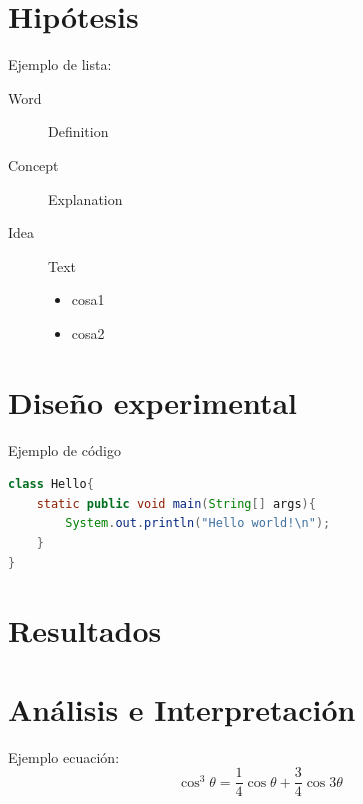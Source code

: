\documentclass[
12pt, %
letterpaper, %
oneside, %
headinclude,footinclude, %
BCOR5mm, %
]{scrartcl}
\begin{document}
\setcounter{tocdepth}{2} %

\tableofcontents %

\newpage 

\section{Hipótesis}

Ejemplo de lista:
\begin{description}
\item[Word] Definition
\item[Concept] Explanation
\item[Idea] Text
	\begin{itemize}
	\item cosa1
	\item cosa2
	\end{itemize}
\end{description}
 
\newpage
\section{Diseño experimental}
Ejemplo de código
\begin{lstlisting}[language=Java]
class Hello{
	static public void main(String[] args){
		System.out.println("Hello world!\n");
	}
}
\end{lstlisting}

\newpage

\section{Resultados}



\newpage

\section{Análisis e Interpretación}
Ejemplo ecuación:
\begin{equation}
\cos^3 \theta =\frac{1}{4}\cos\theta+\frac{3}{4}\cos 3\theta
\label{eq:refname2}
\end{equation}
\end{document}
